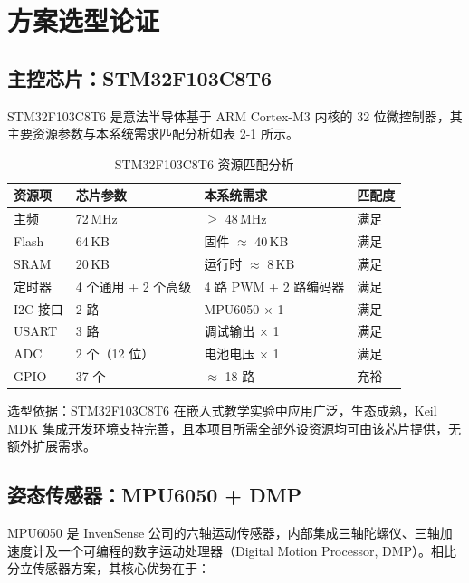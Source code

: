 \documentclass[12pt,a4paper,UTF8]{ctexrep}
\begin{document}
\section{方案选型论证}

\subsection{主控芯片：STM32F103C8T6}

STM32F103C8T6 是意法半导体基于 ARM Cortex-M3 内核的 32 位微控制器，其主要资源参数与本系统需求匹配分析如表 2-1 所示。

\begin{table}[H]
  \centering
  \caption{STM32F103C8T6 资源匹配分析}
  \label{tbl:mcu}
  \begin{tabular}{p{2.5cm}p{3cm}p{3cm}p{3.5cm}}
    \toprule
    \textbf{资源项} & \textbf{芯片参数} & \textbf{本系统需求} & \textbf{匹配度} \\
    \midrule
    主频        & 72\,MHz          & $\geq$ 48\,MHz    & 满足 \\
    Flash       & 64\,KB           & 固件 $\approx$ 40\,KB & 满足 \\
    SRAM        & 20\,KB           & 运行时 $\approx$ 8\,KB & 满足 \\
    定时器      & 4 个通用 + 2 个高级 & 4 路 PWM + 2 路编码器 & 满足 \\
    I2C 接口    & 2 路             & MPU6050 $\times$ 1     & 满足 \\
    USART       & 3 路             & 调试输出 $\times$ 1    & 满足 \\
    ADC         & 2 个（12 位）   & 电池电压 $\times$ 1    & 满足 \\
    GPIO        & 37 个            & $\approx$ 18 路        & 充裕 \\
    \bottomrule
  \end{tabular}
\end{table}

选型依据：STM32F103C8T6 在嵌入式教学实验中应用广泛，生态成熟，Keil MDK 集成开发环境支持完善，且本项目所需全部外设资源均可由该芯片提供，无额外扩展需求。

\subsection{姿态传感器：MPU6050 + DMP}

MPU6050 是 InvenSense 公司的六轴运动传感器，内部集成三轴陀螺仪、三轴加速度计及一个可编程的数字运动处理器（Digital Motion Processor, DMP）。相比分立传感器方案，其核心优势在于：
\end{document}
